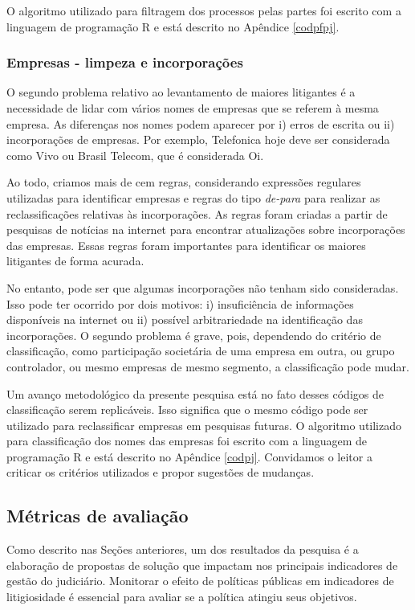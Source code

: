 \documentclass[]{report}
\begin{document}
O algoritmo utilizado para filtragem dos processos pelas partes foi
escrito com a linguagem de programação R e está descrito no Apêndice
\ref{codpfpj}.

\subsubsection{Empresas - limpeza e incorporações}\label{empresas2}

O segundo problema relativo ao levantamento de maiores litigantes é a
necessidade de lidar com vários nomes de empresas que se referem à mesma
empresa. As diferenças nos nomes podem aparecer por i) erros de escrita
ou ii) incorporações de empresas. Por exemplo, Telefonica hoje deve ser
considerada como Vivo ou Brasil Telecom, que é considerada Oi.

Ao todo, criamos mais de cem regras, considerando expressões regulares
utilizadas para identificar empresas e regras do tipo \emph{de-para}
para realizar as reclassificações relativas às incorporações. As regras
foram criadas a partir de pesquisas de notícias na internet para
encontrar atualizações sobre incorporações das empresas. Essas regras
foram importantes para identificar os maiores litigantes de forma
acurada.

No entanto, pode ser que algumas incorporações não tenham sido
consideradas. Isso pode ter ocorrido por dois motivos: i) insuficiência
de informações disponíveis na internet ou ii) possível arbitrariedade na
identificação das incorporações. O segundo problema é grave, pois,
dependendo do critério de classificação, como participação societária de
uma empresa em outra, ou grupo controlador, ou mesmo empresas de mesmo
segmento, a classificação pode mudar.

Um avanço metodológico da presente pesquisa está no fato desses códigos
de classificação serem replicáveis. Isso significa que o mesmo código
pode ser utilizado para reclassificar empresas em pesquisas futuras. O
algoritmo utilizado para classificação dos nomes das empresas foi
escrito com a linguagem de programação R e está descrito no Apêndice
\ref{codpj}. Convidamos o leitor a criticar os critérios utilizados e
propor sugestões de mudanças.

\subsection{Métricas de avaliação}\label{metricas-de-avaliacao}

Como descrito nas Seções anteriores, um dos resultados da pesquisa é a
elaboração de propostas de solução que impactam nos principais
indicadores de gestão do judiciário. Monitorar o efeito de políticas
públicas em indicadores de litigiosidade é essencial para avaliar se a
política atingiu seus objetivos.
\end{document}
